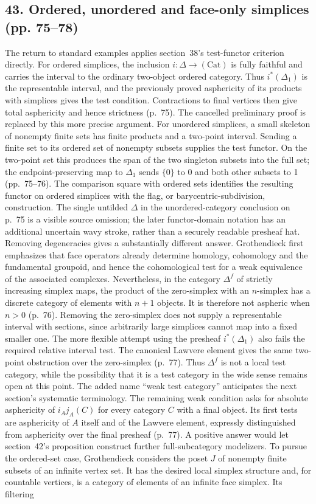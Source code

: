 \documentclass[10pt,oneside]{book}
\begin{document}
\subsection*{43. Ordered, unordered and face-only simplices (pp. 75--78)}
The return to standard examples applies section~38's test-functor criterion directly. For ordered simplices, the inclusion $i:\Delta\to(\mathrm{Cat})$ is fully faithful and carries the interval to the ordinary two-object ordered category. Thus $i^*(\Delta_1)$ is the representable interval, and the previously proved asphericity of its products with simplices gives the test condition. Contractions to final vertices then give total asphericity and hence strictness (p.~75). The cancelled preliminary proof is replaced by this more precise argument. For unordered simplices, a small skeleton of nonempty finite sets has finite products and a two-point interval. Sending a finite set to its ordered set of nonempty subsets supplies the test functor. On the two-point set this produces the span of the two singleton subsets into the full set; the endpoint-preserving map to $\Delta_1$ sends $\{0\}$ to 0 and both other subsets to 1 (pp.~75--76). The comparison square with ordered sets identifies the resulting functor on ordered simplices with the flag, or barycentric-subdivision, construction. The single untilded $\Delta$ in the unordered-category conclusion on p.~75 is a visible source omission; the later functor-domain notation has an additional uncertain wavy stroke, rather than a securely readable presheaf hat. Removing degeneracies gives a substantially different answer. Grothendieck first emphasizes that face operators already determine homology, cohomology and the fundamental groupoid, and hence the cohomological test for a weak equivalence of the associated complexes. Nevertheless, in the category $\Delta^f$ of strictly increasing simplex maps, the product of the zero-simplex with an $n$-simplex has a discrete category of elements with $n+1$ objects. It is therefore not aspheric when $n>0$ (p.~76). Removing the zero-simplex does not supply a representable interval with sections, since arbitrarily large simplices cannot map into a fixed smaller one. The more flexible attempt using the presheaf $i^*(\Delta_1)$ also fails the required relative interval test. The canonical Lawvere element gives the same two-point obstruction over the zero-simplex (p.~77). Thus $\Delta^f$ is not a local test category, while the possibility that it is a test category in the wide sense remains open at this point. The added name ``weak test category'' anticipates the next section's systematic terminology. The remaining weak condition asks for absolute asphericity of $i_Aj_A(C)$ for every category $C$ with a final object. Its first tests are asphericity of $A$ itself and of the Lawvere element, expressly distinguished from asphericity over the final presheaf (p.~77). A positive answer would let section~42's proposition construct further full-subcategory modelizers. To pursue the ordered-set case, Grothendieck considers the poset $J$ of nonempty finite subsets of an infinite vertex set. It has the desired local simplex structure and, for countable vertices, is a category of elements of an infinite face simplex. Its filtering 
\end{document}
